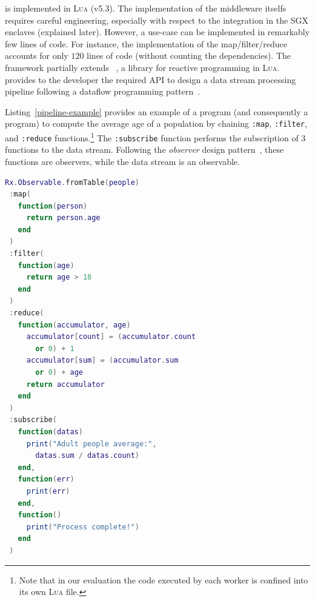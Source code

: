 \SYS{} is implemented in \textsc{Lua} (v5.3).
The implementation of the middleware itselfs requires careful engineering, especially with respect to the integration in the SGX enclaves (explained later).
However, a \SYS{} use-case can be implemented in remarkably few lines of code. 
For instance, the implementation of the map/filter/reduce accounts for only $120$ lines of code (without counting the dependencies).
The framework partially extends \rxl~\cite{github:rxlua}, a library for reactive programming in \textsc{Lua}.
\rxl provides to the developer the required API to design a data stream processing pipeline following a dataflow programming pattern~\cite{uustalu_essence_2005}.

Listing~\ref{pipeline-example} provides an example of a \rxl program (and consequently a \SYS{} program) to compute the average age of a population by chaining \texttt{:map}, \texttt{:filter}, and \texttt{:reduce} functions.\footnote{Note that in our evaluation the code executed by each worker is confined into its own \textsc{Lua} file.}
The \texttt{:subscribe} function performs the subscription of 3 functions to the data stream.
Following the \emph{observer} design pattern~\cite{szallies_using_1997}, these functions are observers, while the data stream is an observable.

\begin{lstlisting}[language=LUA,caption={Example of process pipeline with RxLua.},label=pipeline-example]
Rx.Observable.fromTable(people)
 :map(
   function(person)
     return person.age
   end
 )
 :filter(
   function(age)
     return age > 18
   end
 )
 :reduce(
   function(accumulator, age)
     accumulator[count] = (accumulator.count
       or 0) + 1
     accumulator[sum] = (accumulator.sum
       or 0) + age
     return accumulator
   end
 )
 :subscribe(
   function(datas)
     print("Adult people average:",
       datas.sum / datas.count)
   end,
   function(err)
     print(err)
   end,
   function()
     print("Process complete!")
   end
 )
\end{lstlisting}

